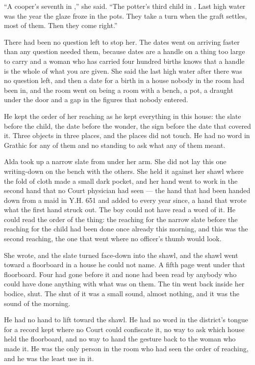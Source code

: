 “A cooper's seventh in ,” she said. “The potter's third child in . Last high water was the year the glaze froze in the pots. They take a turn when the graft settles, most of them. Then they come right.”

There had been no question left to stop her. The dates went on arriving faster than any question needed them, because dates are a handle on a thing too large to carry and a woman who has carried four hundred births knows that a handle is the whole of what you are given. She said the last high water after there was no question left, and then a date for a birth in a house nobody in the room had been in, and the room went on being a room with a bench, a pot, a draught under the door and a gap in the figures that nobody entered.

He kept the order of her reaching as he kept everything in this house: the slate before the child, the date before the wonder, the sign before the date that covered it. Three objects in three places, and the places did not touch. He had no word in Grathic for any of them and no standing to ask what any of them meant.

\scenebreak

Alda took up a narrow slate from under her arm. She did not lay this one writing-down on the bench with the others. She held it against her shawl where the fold of cloth made a small dark pocket, and her hand went to work in the second hand that no Court physician had seen --- the hand that had been handed down from a maid in Y.H. 651 and added to every year since, a hand that wrote what the first hand struck out. The boy could not have read a word of it. He could read the order of the thing: the reaching for the narrow slate before the reaching for the child had been done once already this morning, and this was the second reaching, the one that went where no officer's thumb would look.

She wrote, and the slate turned face-down into the shawl, and the shawl went toward a floorboard in a house he could not name. A fifth page went under that floorboard. Four had gone before it and none had been read by anybody who could have done anything with what was on them. The tin went back inside her bodice, shut. The shut of it was a small sound, almost nothing, and it was the sound of the morning.

He had no hand to lift toward the shawl. He had no word in the district's tongue for a record kept where no Court could confiscate it, no way to ask which house held the floorboard, and no way to hand the gesture back to the woman who made it. He was the only person in the room who had seen the order of reaching, and he was the least use in it.

